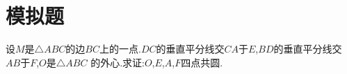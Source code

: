 \documentclass[]{article}
\title{}
\author{}
\date{}
\begin{document}
\maketitle
\section{模拟题}{
设$M$是$\triangle ABC$的边$BC$上的一点.$DC$的垂直平分线交$CA$于$E$,$BD$的垂直平分线交$AB$于$F$,$O$是$\triangle ABC$ 的外心.求证:$O$,$E$,$A$,$F$四点共圆.
}
\end{document}
